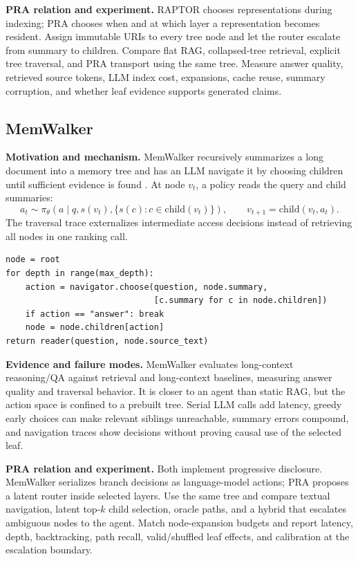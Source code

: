 \textbf{PRA relation and experiment.} RAPTOR chooses representations during indexing;
PRA chooses when and at which layer a representation becomes resident.  Assign immutable
URIs to every tree node and let the router escalate from summary to children.  Compare flat
RAG, collapsed-tree retrieval, explicit tree traversal, and PRA transport using the same
tree.  Measure answer quality, retrieved source tokens, LLM index cost, expansions, cache
reuse, summary corruption, and whether leaf evidence supports generated claims.

\subsection{MemWalker}

\textbf{Motivation and mechanism.} MemWalker recursively summarizes a long document into a
memory tree and has an LLM navigate it by choosing children until sufficient evidence is
found \citep{chen2023memwalker}.  At node $v_t$, a policy reads the query and child summaries:
\begin{equation}
a_t\sim\pi_\theta(a\mid q,s(v_t),\{s(c):c\in\mathrm{child}(v_t)\}),
\qquad v_{t+1}=\mathrm{child}(v_t,a_t).
\end{equation}
The traversal trace externalizes intermediate access decisions instead of retrieving all
nodes in one ranking call.

\begin{lstlisting}[caption={Bounded tree walk}]
node = root
for depth in range(max_depth):
    action = navigator.choose(question, node.summary,
                              [c.summary for c in node.children])
    if action == "answer": break
    node = node.children[action]
return reader(question, node.source_text)
\end{lstlisting}

\textbf{Evidence and failure modes.} MemWalker evaluates long-context reasoning/QA against
retrieval and long-context baselines, measuring answer quality and traversal behavior.  It
is closer to an agent than static RAG, but the action space is confined to a prebuilt tree.
Serial LLM calls add latency, greedy early choices can make relevant siblings unreachable,
summary errors compound, and navigation traces show decisions without proving causal use
of the selected leaf.

\textbf{PRA relation and experiment.} Both implement progressive disclosure.  MemWalker
serializes branch decisions as language-model actions; PRA proposes a latent router inside
selected layers.  Use the same tree and compare textual navigation, latent top-$k$ child
selection, oracle paths, and a hybrid that escalates ambiguous nodes to the agent.  Match
node-expansion budgets and report latency, depth, backtracking, path recall, valid/shuffled
leaf effects, and calibration at the escalation boundary.


